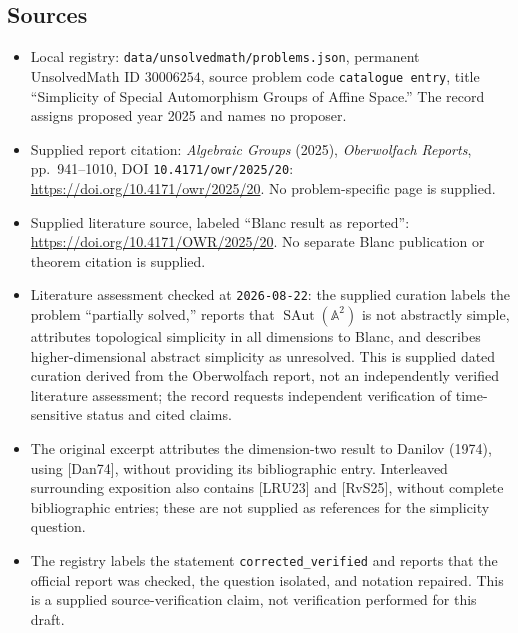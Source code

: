 \documentclass[11pt]{article}
\begin{document}
\subsection{Sources}
\begin{itemize}
\item Local registry: \texttt{data/unsolvedmath/problems.json}, permanent UnsolvedMath ID \(30006254\), source problem code \texttt{catalogue entry}, title ``Simplicity of Special Automorphism Groups of Affine Space.'' The record assigns proposed year 2025 and names no proposer.
\item Supplied report citation: \emph{Algebraic Groups} (2025), \emph{Oberwolfach Reports}, pp.~941--1010, DOI \texttt{10.4171/owr/2025/20}: \url{https://doi.org/10.4171/owr/2025/20}. No problem-specific page is supplied.
\item Supplied literature source, labeled ``Blanc result as reported'': \url{https://doi.org/10.4171/OWR/2025/20}. No separate Blanc publication or theorem citation is supplied.
\item Literature assessment checked at \texttt{2026-08-22}: the supplied curation labels the problem ``partially solved,'' reports that \(\operatorname{SAut}(\mathbb A^2)\) is not abstractly simple, attributes topological simplicity in all dimensions to Blanc, and describes higher-dimensional abstract simplicity as unresolved. This is supplied dated curation derived from the Oberwolfach report, not an independently verified literature assessment; the record requests independent verification of time-sensitive status and cited claims.
\item The original excerpt attributes the dimension-two result to Danilov (1974), using [Dan74], without providing its bibliographic entry. Interleaved surrounding exposition also contains [LRU23] and [RvS25], without complete bibliographic entries; these are not supplied as references for the simplicity question.
\item The registry labels the statement \texttt{corrected\_verified} and reports that the official report was checked, the question isolated, and notation repaired. This is a supplied source-verification claim, not verification performed for this draft.
\end{itemize}
\end{document}
